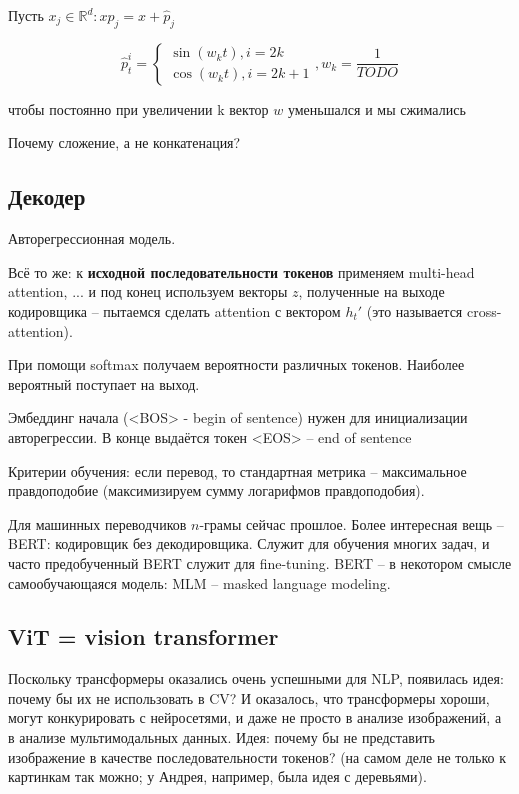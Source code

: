 \documentclass[a4paper,12pt]{article}
\begin{document}
Пусть $ x_j \in \mathds R^d : xp_j = x + \hat p_j $

\[ \hat p_t^i = \begin{cases}
	\sin \left( w_k t \right), i = 2k \\
	\cos \left( w_k t \right), i = 2k + 1
\end{cases}, w_k = \frac{1}{TODO} \]

чтобы постоянно при увеличении k вектор $ w $ уменьшался и мы сжимались

Почему сложение, а не конкатенация?

\subsection{Декодер}

Авторегрессионная модель.

Всё то же: к \textbf{исходной последовательности токенов} применяем multi-head attention, ... и под конец используем векторы $ z $, полученные на выходе кодировщика -- пытаемся сделать attention с вектором $ h_t' $ (это называется cross-attention).

При помощи softmax получаем вероятности различных токенов.
Наиболее вероятный поступает на выход.

Эмбеддинг начала (<BOS> - begin of sentence) нужен для инициализации авторегрессии.
В конце выдаётся токен <EOS> -- end of sentence

Критерии обучения:
если перевод, то стандартная метрика -- максимальное правдоподобие (максимизируем сумму логарифмов правдоподобия).

Для машинных переводчиков  $ n $-грамы сейчас прошлое.
Более интересная вещь -- BERT: кодировщик без декодировщика.
Служит для обучения многих задач, и часто предобученный BERT служит для fine-tuning.
BERT -- в некотором смысле самообучающаяся модель: MLM -- masked language modeling.

\subsection{ViT = vision transformer}

Поскольку трансформеры оказались очень успешными для NLP, появилась идея: почему бы их не использовать в CV?
И оказалось, что трансформеры хороши, могут конкурировать с нейросетями, и даже не просто в анализе изображений, а в анализе мультимодальных данных.
Идея: почему бы не представить изображение в качестве последовательности токенов?
(на самом деле не только к картинкам так можно; у Андрея, например, была идея с деревьями).
\end{document}
